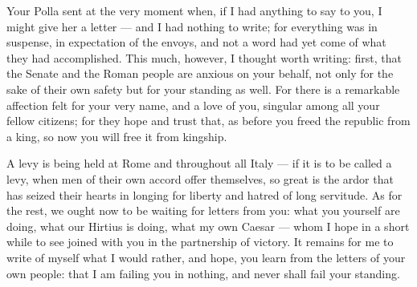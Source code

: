 

 Your Polla sent at the very moment when, if I had anything to say to you, I might give her a letter --- and I had nothing to write; for everything was in suspense, in expectation of the envoys, and not a word had yet come of what they had accomplished. This much, however, I thought worth writing: first, that the Senate and the Roman people are anxious on your behalf, not only for the sake of their own safety but for your standing as well. For there is a remarkable affection felt for your very name, and a love of you, singular among all your fellow citizens; for they hope and trust that, as before you freed the republic from a king, so now you will free it from kingship.

 A levy is being held at Rome and throughout all Italy --- if it is to be called a levy, when men of their own accord offer themselves, so great is the ardor that has seized their hearts in longing for liberty and hatred of long servitude. As for the rest, we ought now to be waiting for letters from you: what you yourself are doing, what our Hirtius is doing, what my own Caesar --- whom I hope in a short while to see joined with you in the partnership of victory. It remains for me to write of myself what I would rather, and hope, you learn from the letters of your own people: that I am failing you in nothing, and never shall fail your standing.
